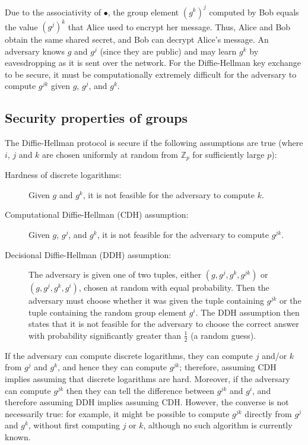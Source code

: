 \documentclass[manuscript]{acmart}
\begin{document}
Due to the associativity of $\bullet$, the group element $(g^k)^j$ computed by Bob equals the value $(g^j)^k$ that Alice used to encrypt her message.
Thus, Alice and Bob obtain the same shared secret, and Bob can decrypt Alice's message.
An adversary knows $g$ and $g^j$ (since they are public) and may learn $g^k$ by eavesdropping as it is sent over the network.
For the Diffie-Hellman key exchange to be secure, it must be computationally extremely difficult for the adversary to compute $g^{jk}$ given $g$, $g^j$, and $g^k$.

\subsection{Security properties of groups}\label{sec:cdh-ddh}

The Diffie-Hellman protocol is secure if the following assumptions are true (where $i$, $j$ and $k$ are chosen uniformly at random from $\mathbb{Z}_p$ for sufficiently large $p$):

\begin{description}
\item[Hardness of discrete logarithms:]
    Given $g$ and $g^k$, it is not feasible for the adversary to compute $k$.
\item[Computational Diffie-Hellman (CDH) assumption:]
    Given $g$, $g^j$, and $g^k$, it is not feasible for the adversary to compute $g^{jk}$.
\item[Decisional Diffie-Hellman (DDH) assumption:]
    The adversary is given one of two tuples, either $(g, g^j, g^k, g^{jk})$ or $(g, g^j, g^k, g^i)$, chosen at random with equal probability.
    Then the adversary must choose whether it was given the tuple containing $g^{jk}$ or the tuple containing the random group element $g^i$.
    The DDH assumption then states that it is not feasible for the adversary to choose the correct answer with probability significantly greater than $\frac{1}{2}$ (a random guess).
\end{description}

If the adversary can compute discrete logarithms, they can compute $j$ and/or $k$ from $g^j$ and $g^k$, and hence they can compute $g^{jk}$; therefore, assuming CDH implies assuming that discrete logarithms are hard.
Moreover, if the adversary can compute $g^{jk}$ then they can tell the difference between $g^{jk}$ and $g^i$, and therefore assuming DDH implies assuming CDH.
However, the converse is not necessarily true: for example, it might be possible to compute $g^{jk}$ directly from $g^j$ and $g^k$, without first computing $j$ or $k$, although no such algorithm is currently known.
\end{document}
